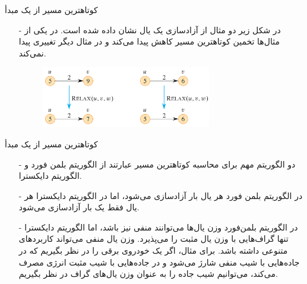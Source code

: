 \begin{frame}{‌کوتاهترین مسیر از یک مبدأ}
\begin{itemize}\itemr
\item[-]
در شکل زیر دو مثال از آزادسازی یک یال نشان داده شده است. در یکی از مثال‌ها تخمین کوتاهترین مسیر کاهش پیدا می‌کند و در مثال دیگر تغییری پیدا نمی‌کند.
\begin{figure}
\includegraphics[width=0.7\textwidth]{figs/chap07/610-relaxation}
\end{figure}
\end{itemize}
\end{frame}


\begin{frame}{‌کوتاهترین مسیر از یک مبدأ}
\begin{itemize}\itemr
\item[-]
دو الگوریتم مهم برای محاسبه کوتاهترین مسیر عبارتند از الگوریتم بلمن فورد و الگوریتم دایکسترا.
\item[-]
در الگوریتم بلمن فورد هر یال
بار آزادسازی می‌شود، اما در الگوریتم دایکسترا هر یال فقط یک بار آزادسازی می‌شود.
\item[-]
در الگوریتم بلمن‌فورد وزن یال‌ها می‌توانند منفی نیز باشد، اما الگوریتم دایکسترا تنها گراف‌هایی با وزن یال مثبت را می‌پذیرد.
وزن یال منفی می‌تواند کاربردهای متنوعی داشته باشد. برای مثال، اگر یک خودروی برقی را در نظر بگیریم که در جاده‌هایی با شیب منفی شارژ می‌شود و در جاده‌هایی با شیب مثبت انرژی مصرف می‌کند، می‌توانیم شیب جاده را به عنوان وزن یال‌های گراف در نظر بگیریم.
\end{itemize}
\end{frame}